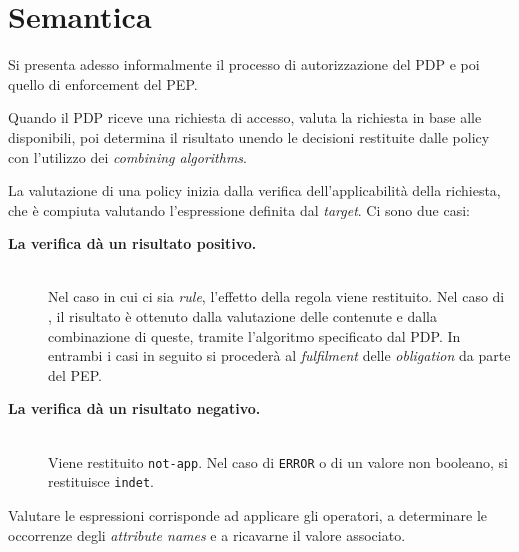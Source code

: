 \section{Semantica}
\label{sec:sem_fpl}
Si presenta adesso informalmente il processo di autorizzazione del \ac{PDP} e poi quello di enforcement del \ac{PEP}.\par
Quando il \ac{PDP} riceve una richiesta di accesso, valuta la richiesta in base alle \epolicy disponibili, poi determina
il risultato unendo le decisioni restituite dalle policy con l'utilizzo dei \emph{combining algorithms}.\par
La valutazione di una policy inizia dalla verifica dell'applicabilità della richiesta, che è compiuta valutando
l'espressione definita dal \emph{target}. Ci sono due casi:
\begin{description}
  \item[\normalfont\bfseries{\MakeUppercase{L}a verifica dà un risultato positivo.}] \hfill \\
        Nel caso in cui ci sia \emph{rule}, l'effetto della regola viene restituito.
        Nel caso di \ePolicySet, il risultato è ottenuto dalla valutazione delle \epolicy contenute e dalla combinazione di queste,
        tramite l'algoritmo specificato dal \ac{PDP}. In entrambi i casi in seguito si procederà al \emph{fulfilment} delle
        \emph{obligation} da parte del \ac{PEP}.
  \item[\normalfont\bfseries{\MakeUppercase{L}a verifica dà un risultato negativo.}] \hfill \\
        Viene restituito \texttt{not-app}. Nel caso di \texttt{ERROR} o di un valore non booleano,
        si restituisce \texttt{indet}.
\end{description}
Valutare le espressioni corrisponde ad applicare gli operatori, a determinare le occorrenze degli \emph{attribute names} e
a ricavarne il valore associato.\par
